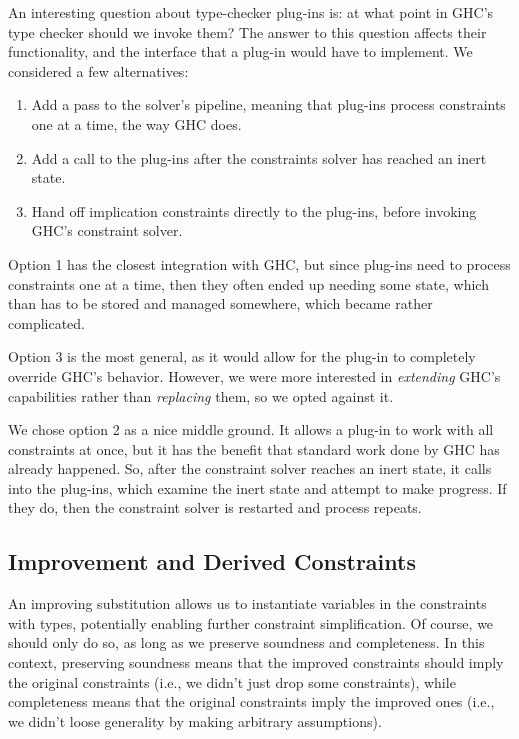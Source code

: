 \documentclass{sigplanconf}
\begin{document}
An interesting question about type-checker plug-ins is: at what point in
GHC's type checker should we invoke them?  The answer to this question
affects their functionality, and the interface that a plug-in would have
to implement.  We considered a few alternatives:
\begin{enumerate}
\item Add a pass to the solver's pipeline, meaning that plug-ins process
constraints one at a time, the way GHC does.
\item Add a call to the plug-ins after the constraints solver has reached
an inert state.
\item Hand off implication constraints directly to the plug-ins,
before invoking GHC's constraint solver.
\end{enumerate}

Option 1 has the closest integration with GHC, but since plug-ins need
to process constraints one at a time, then they often ended up needing
some state, which than has to be stored and managed somewhere,
which became rather complicated.

Option 3 is the most general, as it
would allow for the plug-in to completely override GHC's behavior.  However,
we were more interested in {\em extending} GHC's capabilities rather than
{\em replacing} them, so we opted against it.

We chose option 2 as a nice middle ground. It allows a plug-in to
work with all constraints at once, but it has the benefit that standard work
done by GHC has already happened. So, after the constraint
solver reaches an inert state, it calls into the plug-ins, which examine
the inert state and attempt to make progress.  If they do, then the
constraint solver is restarted and process repeats.

\subsection{Improvement and Derived Constraints}
An improving substitution \cite{improvement} allows us to instantiate variables
in the constraints with types, potentially enabling further constraint
simplification.  Of course, we should only do so, as long
as we preserve soundness and completeness.  In this context, preserving
soundness means that the improved constraints should imply the original
constraints (i.e., we didn't just drop some constraints),
while completeness means that the original constraints imply the improved ones
(i.e., we didn't loose generality by making arbitrary assumptions).
\end{document}
